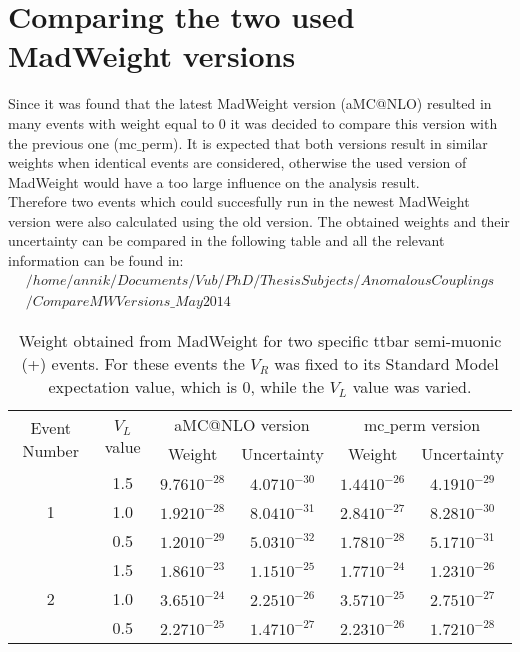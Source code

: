 
\section{Comparing the two used MadWeight versions}
Since it was found that the latest MadWeight version (aMC@NLO) resulted in many events with weight equal to $0$ it was decided to compare this version with the previous one (mc$\_$perm). It is expected that both versions result in similar weights when identical events are considered, otherwise the used version of MadWeight would have a too large influence on the analysis result.\\
Therefore two events which could succesfully run in the newest MadWeight version were also calculated using the old version. The obtained weights and their uncertainty can be compared in the following table and all the relevant information can be found in:
\begin{eqnarray*}
 /home/annik/Documents/Vub/PhD/ThesisSubjects/AnomalousCouplings\\ /CompareMWVersions\_May2014
\end{eqnarray*}

\begin{table}[h!]
 \centering
 \begin{tabular}{|c|c|c|c|c|c|}
  \hline
  \multirow{2}{*}{Event Number} &  \multirow{2}{*}{$V_L$ value}	& \multicolumn{2}{|c|}{aMC@NLO version}		& \multicolumn{2}{|c|}{mc$\_$perm version}  	\\
				&  				& Weight		& Uncertainty		& Weight 		& Uncertainty  		\\
  \hline
  \multirow{3}{*}{1} 		& 1.5 				& $9.76 10^{-28}$	& $4.07 10^{-30}$	& $1.44 10^{-26}$	& $4.19 10^{-29}$	\\
				& 1.0				& $1.92 10^{-28}$	& $8.04 10^{-31}$	& $2.84 10^{-27}$	& $8.28 10^{-30}$	\\
				& 0.5				& $1.20 10^{-29}$	& $5.03 10^{-32}$	& $1.78 10^{-28}$	& $5.17 10^{-31}$	\\
  \hline 
  \multirow{3}{*}{2}	 	& 1.5 				& $1.86 10^{-23}$	& $1.15 10^{-25}$	& $1.77 10^{-24}$	& $1.23 10^{-26}$	\\
				& 1.0				& $3.65 10^{-24}$	& $2.25 10^{-26}$	& $3.57 10^{-25}$	& $2.75 10^{-27}$	\\
				& 0.5				& $2.27 10^{-25}$	& $1.47 10^{-27}$	& $2.23 10^{-26}$	& $1.72 10^{-28}$	\\
  \hline 
 \end{tabular} 
 \caption{Weight obtained from MadWeight for two specific ttbar semi-muonic (+) events. For these events the $V_R$ was fixed to its Standard Model expectation value, which is $0$, while the $V_L$ value was varied.} 
\end{table}

